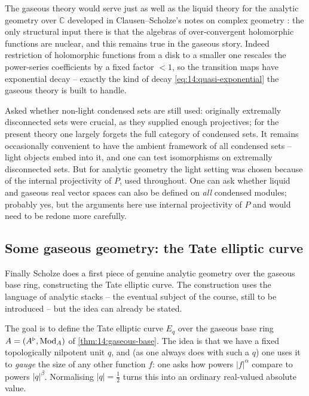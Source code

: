 \begin{remark}
\label{rmk:14:complex-geometry}
The gaseous theory would serve just as well as the liquid theory for the analytic
geometry over $\mathbb{C}$ developed in Clausen--Scholze's notes on complex geometry
\cite{scholze2020analytic}: the only structural input there is that the algebras of
over-convergent holomorphic functions are nuclear, and this remains true in the
gaseous story. Indeed restriction of holomorphic functions from a disk to a smaller
one rescales the power-series coefficients by a fixed factor $<1$, so the transition
maps have exponential decay -- exactly the kind of decay
\eqref{eq:14:quasi-exponential} the gaseous theory is built to handle.
\end{remark}

\begin{remark}
\label{rmk:14:light-vs-all}
Asked whether non-light condensed sets are still used: originally extremally
disconnected sets were crucial, as they supplied enough projectives; for the present
theory one largely forgets the full category of condensed sets. It remains
occasionally convenient to have the ambient framework of all condensed sets -- light
objects embed into it, and one can test isomorphisms on extremally disconnected sets.
But for analytic geometry the light setting was chosen because of the internal
projectivity of $P$, used throughout. One can ask whether liquid and gaseous real
vector spaces can also be defined on \emph{all} condensed modules; probably yes, but
the arguments here use internal projectivity of $P$ and would need to be redone more
carefully.
\end{remark}

\subsection{Some gaseous geometry: the Tate elliptic curve}

Finally Scholze does a first piece of genuine analytic geometry over the gaseous base
ring, constructing the Tate elliptic curve. The construction uses the language of
analytic stacks -- the eventual subject of the course, still to be introduced -- but
the idea can already be stated.

\begin{remark}
\label{rmk:14:tate-goal}
The goal is to define the Tate elliptic curve $E_q$ over the gaseous base ring
$A=(A^{\triangleright},\operatorname{Mod}_A)$ of \cref{thm:14:gaseous-base}. The idea is that we have a fixed
topologically nilpotent unit $q$, and (as one always does with such a $q$) one
uses it to \emph{gauge} the size of any other function $f$: one asks
how powers $|f|^{\alpha}$ compare to powers $|q|^{\beta}$. Normalising $|q|=\tfrac12$
turns this into an ordinary real-valued absolute value.
\end{remark}

